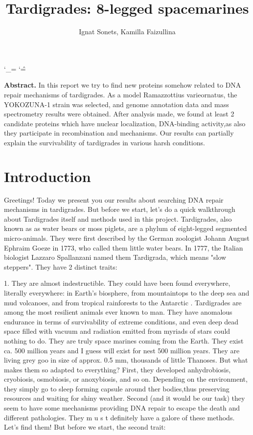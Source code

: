 \documentclass{article}
\title{ Tardigrades: 8-legged spacemarines }
\author{ Ignat Sonets, Kamilla Faizullina}
\date{\empty}
\begin{document}
	\catcode`\_=\active
		\catcode`\^=\active
\maketitle
 
 
 \textbf{Abstract.} In this report we try to find new proteins somehow related to DNA repair mechanisms of tardigrades. As a model Ramazzottius varieornatus, the YOKOZUNA-1 strain was selected, and genome annotation data and mass spectrometry results were obtained. After analysis made, we found at least 2 candidate proteins which have  nuclear localization, DNA-binding activity,as also they participate in recombination and mechanisms. Our results can partially explain the survivability of tardigrades in various harsh conditions.
 
 
\section{Introduction}
 
 Greetings! Today we present you our results about searching DNA repair mechanisms in tardigrades. But before we start, let's do a quick walkthrough about Tardigrades itself and methods used in this project.
 Tardigrades, also known as as water bears or moss piglets, are a phylum of eight-legged segmented micro-animals. They were first described by the German zoologist Johann August Ephraim Goeze in 1773, who called them little water bears. In 1777, the Italian biologist Lazzaro Spallanzani named them Tardigrada, which means "slow steppers"\cite{1}. 
 They have 2 distinct traits:
 
 1. They are almost indestructible. They could have been found everywhere, literally everywhere: in Earth's biosphere, from mountaintops to the deep sea and mud volcanoes, and from tropical rainforests to the Antarctic \cite{1}. Tardigrades are among the most resilient animals ever known to man. They have anomalous endurance in terms of survivability of extreme conditions, and even deep dead space filled with vacuum and radiation emitted from myriads of stars could nothing to do. They are truly space marines coming from the Earth. They exist ca. 500 million years and I guess will exist for nest 500 million years. They are living grey goo in size of approx. 0.5 mm, thousands of little Thanoses. But what makes them so adapted to everything? First, they developed  anhydrobiosis, cryobiosis, osmobiosis, or anoxybiosis, and so on. Depending on the environment, they simply go to sleep forming capsule around ther bodies,thus preserving resources and waiting for shiny weather. Second (and it would be our task) they seem to have some mechanisms providing DNA repair to escape the death and different pathologies. They m u s t definitely have a galore of these methods. Let's find them! But before we start, the second trait:
 
\end{document}
